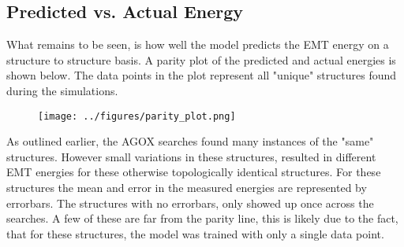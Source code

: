 \documentclass[working, oneside]{../../../Preambles/marginclass}
\begin{document}
\subsection*{Predicted vs. Actual Energy}
What remains to be seen, is how well the model predicts the EMT energy on a structure to structure basis. A parity plot of the predicted and actual energies is shown below. The data points in the plot represent all "unique" structures found during the simulations. 
\begin{figure}[htpb]
    \centering
    \texttt{[image: ../figures/parity\_plot.png]}
    \caption{}
    \label{fig:}
\end{figure}
As outlined earlier, the AGOX searches found many instances of the "same" structures. However small variations in these structures, resulted in different EMT energies for these otherwise topologically identical structures. For these structures the mean and error in the measured energies are represented by errorbars. The structures with no errorbars, only showed up once across the searches. A few of these are far from the parity line, this is likely due to the fact, that for these structures, the model was trained with only a single data point.  



\end{document}
